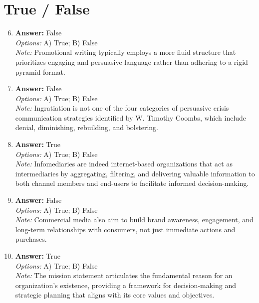 \documentclass[12pt]{article}
\begin{document}
\section*{True / False}
\begin{enumerate}[label=\arabic*.]
\setcounter{enumi}{5}
\item \textbf{Answer:} False
\\ \textit{Options:} A) True; B) False
\\ \textit{Note:} Promotional writing typically employs a more fluid structure that prioritizes engaging and persuasive language rather than adhering to a rigid pyramid format.
\item \textbf{Answer:} False
\\ \textit{Options:} A) True; B) False
\\ \textit{Note:} Ingratiation is not one of the four categories of persuasive crisis communication strategies identified by W. Timothy Coombs, which include denial, diminishing, rebuilding, and bolstering.
\item \textbf{Answer:} True
\\ \textit{Options:} A) True; B) False
\\ \textit{Note:} Infomediaries are indeed internet-based organizations that act as intermediaries by aggregating, filtering, and delivering valuable information to both channel members and end-users to facilitate informed decision-making.
\item \textbf{Answer:} False
\\ \textit{Options:} A) True; B) False
\\ \textit{Note:} Commercial media also aim to build brand awareness, engagement, and long-term relationships with consumers, not just immediate actions and purchases.
\item \textbf{Answer:} True
\\ \textit{Options:} A) True; B) False
\\ \textit{Note:} The mission statement articulates the fundamental reason for an organization's existence, providing a framework for decision-making and strategic planning that aligns with its core values and objectives.
\end{enumerate}
\end{document}
